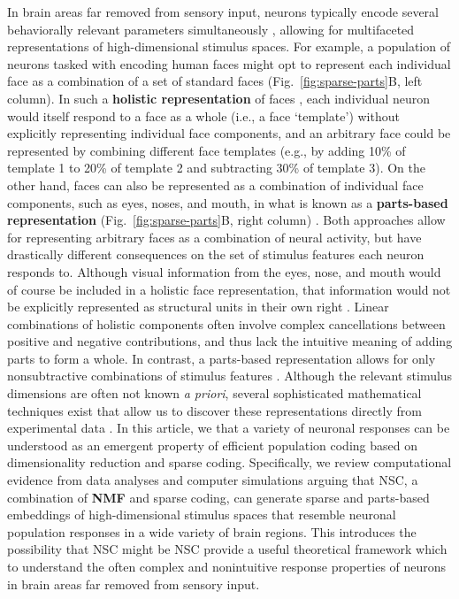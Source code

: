 In brain areas far removed from sensory input,
neurons typically encode several behaviorally relevant parameters
simultaneously \cite{Rigotti2013,Park2014,PaganRust2014,PougetSejnowski1997},
allowing for multifaceted representations of high-dimensional stimulus spaces.
For example, a population of neurons tasked with encoding human faces
might opt to represent each individual face as a combination of a set of
standard faces (Fig.~\ref{fig:sparse-parts}B, left column).
In such a \textbf{holistic representation} of faces \cite{TanakaFarah1993},
each individual neuron would itself respond to a face as a whole
(i.e., a face `template')
without explicitly representing individual face components,
and an arbitrary face could be represented by 
combining different face templates
(e.g., by adding 10\% of template 1 to 20\% of template 2
and subtracting 30\% of template 3).
On the other hand, faces can also be represented as a combination
of individual face components, such as eyes, noses, and mouth,
in what is known as a \textbf{parts-based representation}
(Fig.~\ref{fig:sparse-parts}B, right column) \cite{Palmer1977}.
Both approaches allow for representing arbitrary faces as a combination of
neural activity, but have drastically different consequences on the
set of stimulus features each neuron responds to.
Although visual information from the eyes, nose, and mouth would of course be
included in a holistic face representation,
that information would not be explicitly represented as structural units
in their own right \cite{TanakaFarah1993}.
Linear combinations of holistic components often involve complex cancellations
between positive and negative contributions,
and thus lack the intuitive meaning of adding parts to form a whole.
In contrast, a parts-based representation allows for only nonsubtractive
combinations of stimulus features \cite{Palmer1977}.
Although the relevant stimulus dimensions are often not known \emph{a priori},
several sophisticated mathematical techniques exist that
allow us to discover these representations directly from experimental data
\cite{Brunton2016,CunninghamYu2014,PillowSimoncelli2006,Sharpee2014,Gao2017,ChangTsao2017}.
In this article, we  that a variety of neuronal responses
can be understood as an emergent property of efficient population coding
based on dimensionality reduction and sparse coding.
Specifically, we review computational evidence
from data analyses and computer simulations arguing that \ac{NSC}, 
a combination of \textbf{\ac{NMF}}
\cite{PaateroTapper1994,LeeSeung1999} 
and sparse coding,
can generate sparse and parts-based embeddings of
high-dimensional stimulus  spaces
that resemble  neuronal population responses in a 
wide variety of brain regions.
This introduces the possibility that \ac{NSC} might be 
 \ac{NSC}  provide a useful theoretical framework  which
to understand the often complex and nonintuitive response properties of neurons
in brain areas far removed from sensory input.
